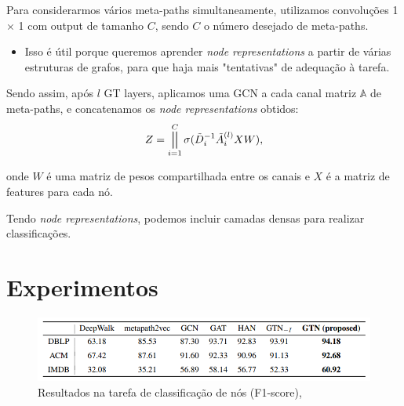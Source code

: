 \documentclass[12pt,notheorems,hyperref={pdfauthor=whatever}]{beamer}
\DeclareMathOperator*{\concat}{\scalerel*{\Vert}{\sum}}
\begin{document}
\begin{frame}
Para considerarmos vários meta-paths simultaneamente, utilizamos convoluções 1 $\times$ 1 com output de tamanho $C$, sendo $C$ o número desejado de meta-paths.

\begin{itemize}
    \item Isso é útil porque queremos aprender \textit{node representations} a partir de várias estruturas de grafos, para que haja mais "tentativas" de adequação à tarefa. 
\end{itemize}


\vspace{10pt}

Sendo assim, após $l$ GT layers, aplicamos uma GCN a cada canal  matriz $\mathbb{A}$ de meta-paths, e concatenamos os \textit{node representations} obtidos:
$$Z =\concat_{i=1}^C\sigma(\Tilde{D}_i^{-1} \Tilde{A}_i^{(l)}XW),$$

onde $W$ é uma matriz de pesos compartilhada entre os canais e $X$ é a matriz de features para cada nó.

\vspace{10pt}

Tendo \textit{node representations}, podemos incluir camadas densas para realizar classificações.
\end{frame}


\section{Experimentos}

\begin{frame}
    \begin{figure}
        \centering
        \includegraphics[width=15cm]{img/experiments.png}
        \caption{Resultados na tarefa de classificação de nós (F1-score), \cite{DBLP:journals/corr/abs-1911-06455}}
        \label{fig:enter-label}
    \end{figure}
    
\end{frame}
\end{document}
